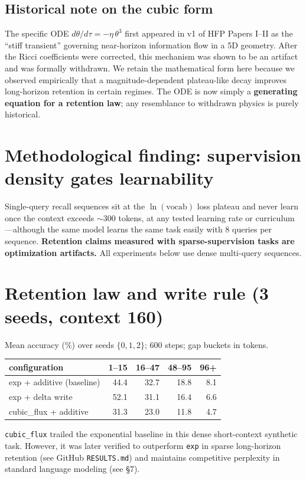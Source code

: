 \documentclass[11pt,a4paper]{article}
\newcommand{\code}[1]{\texttt{#1}}
\begin{document}
\subsection*{Historical note on the cubic form}
The specific ODE $d\theta/d\tau = -\eta\,\theta^{3}$ first appeared in v1 of HFP Papers I--II as the ``stiff transient'' governing near-horizon information flow in a 5D geometry. After the Ricci coefficients were corrected, this mechanism was shown to be an artifact and was formally withdrawn. We retain the mathematical form here because we observed empirically that a magnitude-dependent plateau-like decay improves long-horizon retention in certain regimes. The ODE is now simply a \textbf{generating equation for a retention law}; any resemblance to withdrawn physics is purely historical.

\section{Methodological finding: supervision density gates learnability}
Single-query recall sequences sit at the $\ln(\mathrm{vocab})$ loss plateau and never learn once the context exceeds $\sim$300 tokens, at any tested learning rate or curriculum---although the same model learns the same task easily with 8 queries per sequence. \textbf{Retention claims measured with sparse-supervision tasks are optimization artifacts.} All experiments below use dense multi-query sequences.

\section{Retention law and write rule (3 seeds, context 160)}
Mean accuracy (\%) over seeds $\{0,1,2\}$; 600 steps; gap buckets in tokens.

\begin{table}[h]\centering
\begin{tabular}{lrrrr}
\toprule
configuration & 1--15 & 16--47 & 48--95 & 96+ \\
\midrule
exp + additive (baseline) & 44.4 & 32.7 & 18.8 & 8.1 \\
exp + delta write         & 52.1 & 31.1 & 16.4 & 6.6 \\
cubic\_flux + additive    & 31.3 & 23.0 & 11.8 & 4.7 \\
\bottomrule
\end{tabular}
\end{table}

\noindent
\code{cubic\_flux} trailed the exponential baseline in this dense short-context synthetic task. However, it was later verified to outperform \code{exp} in sparse long-horizon retention (see GitHub \code{RESULTS.md}) and maintains competitive perplexity in standard language modeling (see \S7).
\end{document}
